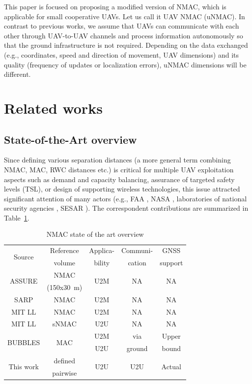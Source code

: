 \documentclass[conference]{IEEEtran}
\begin{document}
This paper is focused on proposing a modified version of NMAC, which is applicable for small cooperative UAVs. 
Let us call it UAV NMAC (uNMAC). 
In contrast to previous works, we assume that UAVs can communicate with each other through UAV-to-UAV channels and process information autonomously so that the ground infrastructure is not required. 
Depending on the data exchanged (e.g., coordinates, speed and direction of movement, UAV dimensions) and its quality (frequency of updates or localization errors), uNMAC dimensions will be different. 

\section{Related works}
\subsection{State-of-the-Art overview}
Since defining various separation distances (a more general term combining NMAC, MAC, RWC distances etc.) is critical for multiple UAV exploitation aspects such as demand and capacity balancing, assurance of targeted safety levels (TSL), or design of supporting wireless technologies, this issue attracted significant attention of many actors (e.g., FAA \cite{Assure,Cook15}, NASA \cite{Cook15}, laboratories of national security agencies \cite{Weinert16,Weinert18,Weinert22}, SESAR \cite{Bubbles21}). 
The correspondent contributions are summarized in Table~\ref{Tab:sota}. 

\begin{table}[h]
\color{black}
\centering
\caption{NMAC state of the art overview}
\label{Tab:sota}
\begin{tabular}{c||c|c|c|c}
\midrule
\multirow{ 2}{*}{Source}& Reference & Applica-& Communi-&GNSS \\ 
& volume& bility& cation&support\\ \midrule


\multirow{ 2}{*}{ASSURE \cite{Assure}}& NMAC&\multirow{ 2}{*}{U2M}&\multirow{ 2}{*}{NA}&\multirow{ 2}{*}{NA}\\
&(150x30~m)&&&\\
\midrule
SARP \cite{Weinert16,Cook15}& NMAC&U2M&NA&NA\\\midrule
MIT LL\cite{Weinert18}& NMAC &U2M&NA&NA\\ \midrule
MIT LL\cite{Weinert22}& sNMAC &U2U&NA&NA\\ \midrule
\multirow{ 2}{*}{BUBBLES \cite{Bubbles21}}& \multirow{ 2}{*}{MAC} &U2M&via&Upper\\
&&U2U&ground&bound\\ \midrule
\multirow{ 2}{*}{This work}& defined&\multirow{ 2}{*}{U2U}&\multirow{ 2}{*}{U2U}&\multirow{ 2}{*}{Actual}\\
& pairwise&&&\\
\midrule

\end{tabular}
\\[3mm]
\end{table}
\end{document}
